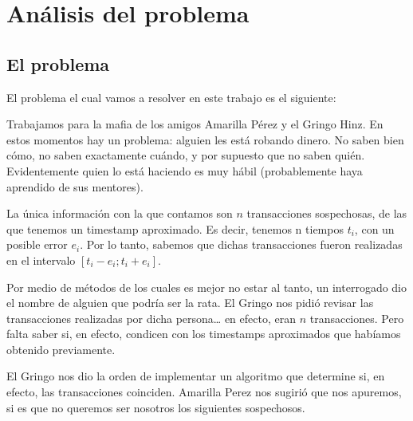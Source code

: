 \section{Análisis del problema}

\subsection{El problema}

El problema el cual vamos a resolver en este trabajo es el siguiente:


\setlength{\leftskip}{4em} %
Trabajamos para la mafia de los amigos Amarilla Pérez y el Gringo Hinz. En estos momentos hay un problema: alguien les está robando dinero. No saben bien cómo, no saben exactamente cuándo, y por supuesto que no saben quién. Evidentemente quien lo está haciendo es muy hábil (probablemente haya aprendido de sus mentores).

La única información con la que contamos son $n$ transacciones sospechosas, de las que tenemos un timestamp aproximado. Es decir, tenemos n tiempos \(t_i\), con un posible error \(e_i\). Por lo tanto, sabemos que dichas transacciones fueron realizadas en el intervalo \([t_i - e_i; t_i + e_i]\).

Por medio de métodos de los cuales es mejor no estar al tanto, un interrogado dio el nombre de alguien que podría ser la rata. El Gringo nos pidió revisar las transacciones realizadas por dicha persona… en efecto, eran $n$ transacciones. Pero falta saber si, en efecto, condicen con los timestamps aproximados que habíamos obtenido previamente.

El Gringo nos dio la orden de implementar un algoritmo que determine si, en efecto, las transacciones coinciden. Amarilla Perez nos sugirió que nos apuremos, si es que no queremos ser nosotros los siguientes sospechosos.

